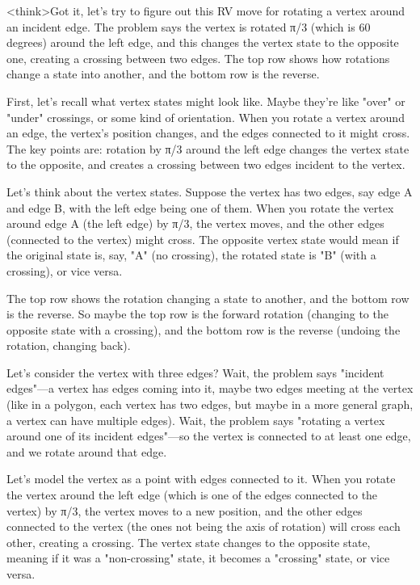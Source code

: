 <think>Got it, let's try to figure out this RV move for rotating a vertex around an incident edge. The problem says the vertex is rotated π/3 (which is 60 degrees) around the left edge, and this changes the vertex state to the opposite one, creating a crossing between two edges. The top row shows how rotations change a state into another, and the bottom row is the reverse. 

First, let's recall what vertex states might look like. Maybe they're like "over" or "under" crossings, or some kind of orientation. When you rotate a vertex around an edge, the vertex's position changes, and the edges connected to it might cross. The key points are: rotation by π/3 around the left edge changes the vertex state to the opposite, and creates a crossing between two edges incident to the vertex. 

Let's think about the vertex states. Suppose the vertex has two edges, say edge A and edge B, with the left edge being one of them. When you rotate the vertex around edge A (the left edge) by π/3, the vertex moves, and the other edges (connected to the vertex) might cross. The opposite vertex state would mean if the original state is, say, "A" (no crossing), the rotated state is "B" (with a crossing), or vice versa. 

The top row shows the rotation changing a state to another, and the bottom row is the reverse. So maybe the top row is the forward rotation (changing to the opposite state with a crossing), and the bottom row is the reverse (undoing the rotation, changing back). 

Let's consider the vertex with three edges? Wait, the problem says "incident edges"—a vertex has edges coming into it, maybe two edges meeting at the vertex (like in a polygon, each vertex has two edges, but maybe in a more general graph, a vertex can have multiple edges). Wait, the problem says "rotating a vertex around one of its incident edges"—so the vertex is connected to at least one edge, and we rotate around that edge. 

Let's model the vertex as a point with edges connected to it. When you rotate the vertex around the left edge (which is one of the edges connected to the vertex) by π/3, the vertex moves to a new position, and the other edges connected to the vertex (the ones not being the axis of rotation) will cross each other, creating a crossing. The vertex state changes to the opposite state, meaning if it was a "non-crossing" state, it becomes a "crossing" state, or vice versa. 

